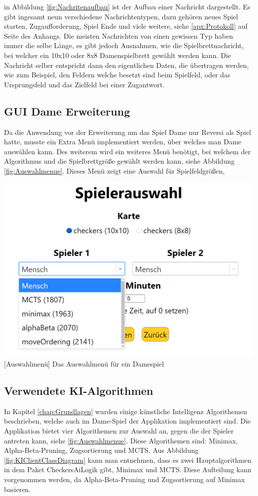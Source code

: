 \documentclass[12pt,a4paper,bibliography=totocnumbered,listof=totocnumbered]{article}
\begin{document}
in Abbildung \ref{fig:Nachritenaufbau} ist der Aufbau einer Nachricht dargestellt. Es gibt ingesamt neun verschiedene Nachrichtentypen, dazu gehören 
neues Spiel starten, Zugaufforderung, Spiel Ende und viele weitere, siehe \ref{apx:Protokoll} auf Seite \pageref{apx:Protokoll} des Anhangs. Die meisten Nachrichten von einen gewissen Typ haben immer die selbe Länge, es gibt jedoch
Ausnahmen, wie die Spielbrettnachricht, bei welcher ein 10x10 oder 8x8 Damenspielbrett gewählt werden kann. Die Nachricht selber entspricht dann den eigentlichen 
Daten, die übertragen werden, wie zum Beispiel, den Feldern welche besetzt sind beim Spielfeld, oder das Ursprungsfeld und das Zielfeld bei einer Zugantwort. 

\subsection{GUI Dame Erweiterung}
Da die Anwendung vor der Erweiterung um das Spiel Dame nur Reversi als Spiel hatte, musste ein Extra Menü implementiert werden, über welches man Dame auswählen kann.
Des weiterem wird ein weiteres Menü benötigt, bei welchem der Algorithmus und die Spielbrettgröße gewählt werden kann, siehe Abbildung \ref{fig:Auswahlmenue}.
Dieses Menü zeigt eine Auswahl für Spielfeldgrößen, 

\vspace{1em}
\begin{minipage}{\linewidth}
	\centering
	\includegraphics[width=0.7\linewidth]{pics/AlgorithmeninderApplikation.png}
	[Auswahlmenü]{ Das Auswahlmenü für ein Damespiel }
	\label{fig:Auswahlmenue}
\end{minipage}

\subsection{Verwendete KI-Algorithmen}
\label{chap:KIAlgorithms}
In Kapitel \ref{chap:Grundlagen} wurden einige künstliche Intelligenz Algorithemen beschrieben, welche auch im Dame-Spiel der Applikation implementiert sind.
Die Applikation bietet vier Algorithemen zur Auswahl an, gegen die der Spieler antreten kann, siehe \ref{fig:Auswahlmenue}. 
Diese Algorithemen sind: Minimax, Alpha-Beta-Pruning, Zugsortierung und MCTS.
Aus Abbildung \ref{fig:KIClientClassDiagram}
kann man entnehmen, dass es zwei Hauptalgorithmen in dem Paket CheckersAiLogik gibt, Minimax und MCTS. Diese Aufteilung kann vorgenommen werden,
da Alpha-Beta-Pruning und Zugsortierung auf Minimax basieren.
\end{document}
